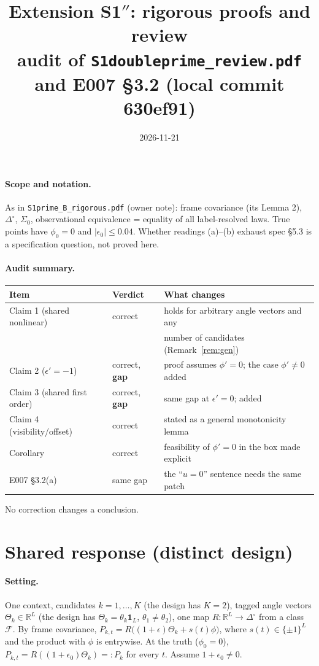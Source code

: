 \documentclass[11pt,a4paper]{article}
\title{Extension S1$''$: rigorous proofs and review\\[2pt]
\large audit of \texttt{S1doubleprime\_review.pdf} and E007 §3.2 (local commit 630ef91)}
\date{2026-11-21}
\author{}
\theoremstyle{remark}
\newcommand{\R}{\mathbb{R}}
\newcommand{\simp}{\Delta^{\circ}}
\newcommand{\eps}{\epsilon}
\begin{document}
\maketitle

\paragraph{Scope and notation.} As in \texttt{S1prime\_B\_rigorous.pdf} (owner note):
frame covariance (its Lemma 2), $\simp$, $\Sigma_0$, observational equivalence = equality
of all label-resolved laws. True points have $\phi_0=0$ and $|\eps_0|\le0.04$. Whether
readings (a)--(b) exhaust spec §5.3 is a specification question, not proved here.

\paragraph{Audit summary.}
\begin{center}
\begin{tabular}{@{}lll@{}}
\toprule
Item & Verdict & What changes\\
\midrule
Claim 1 (shared nonlinear) & correct & holds for arbitrary angle vectors and any\\
& & number of candidates (Remark~\ref{rem:gen})\\
Claim 2 ($\eps'=-1$) & correct, \textbf{gap} & proof assumes $\phi'=0$; the case $\phi'\neq0$ added\\
Claim 3 (shared first order) & correct, \textbf{gap} & same gap at $\eps'=0$; added\\
Claim 4 (visibility/offset) & correct & stated as a general monotonicity lemma\\
Corollary & correct & feasibility of $\phi'=0$ in the box made explicit\\
E007 §3.2(a) & same gap & the ``$u=0$'' sentence needs the same patch\\
\bottomrule
\end{tabular}
\end{center}
No correction changes a conclusion.

\section{Shared response (distinct design)}

\paragraph{Setting.} One context, candidates $k=1,\dots,K$ (the design has $K=2$),
tagged angle vectors $\Theta_k\in\R^L$ (the design has $\Theta_k=\theta_k\mathbf 1_L$,
$\theta_1\neq\theta_2$), one map $R:\R^L\to\simp$ from a class $\mathcal F$. By frame
covariance, $P_{k,t}=R\bigl((1+\eps)\Theta_k+s(t)\phi\bigr)$, where $s(t)\in\{\pm1\}^L$ and
the product with $\phi$ is entrywise. At the truth ($\phi_0=0$),
$P_{k,t}=R((1+\eps_0)\Theta_k)=:P_k$ for every $t$. Assume $1+\eps_0\neq0$.
\end{document}
